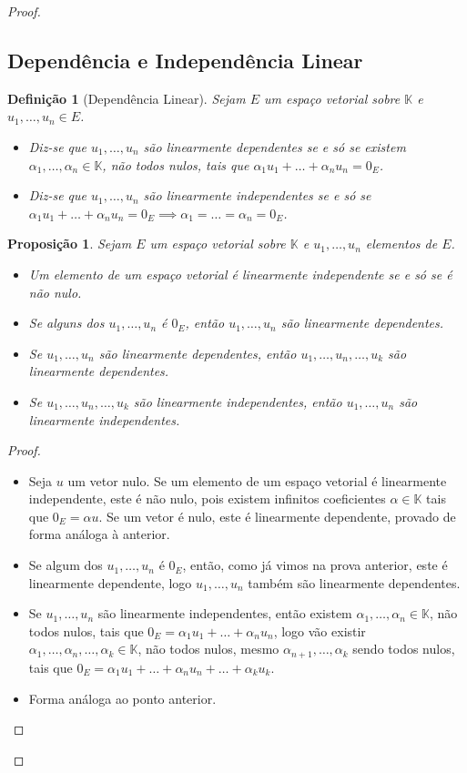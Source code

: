\documentclass{article}
\newtheorem{proposition}{Proposição}[section]
\newtheorem{definition}{Definição}[section]
\begin{document}
\begin{proof}
\subsection{Dependência e Independência Linear}

	\begin{definition}[Dependência Linear]
		Sejam $E$ um espaço vetorial sobre $\mathbb{K}$ e $u_1,\dots,u_n \in E$.
		\begin{itemize}
    			\item Diz-se que $u_1,\dots,u_n$ são linearmente dependentes se e só se existem $\alpha_1,\dots,\alpha_n \in \mathbb{K}$, não todos nulos, tais que $\alpha_1 u_1 + \dots +\alpha_n u_n = 0_E$.
			\item Diz-se que $u_1,\dots,u_n$ são linearmente independentes se e só se $\alpha_1 u_1 + \dots +\alpha_n u_n = 0_E \implies \alpha_1 = \dots =\alpha_n= 0_E$.
		\end{itemize}
	\end{definition}

	\begin{proposition}
		Sejam $E$ um espaço vetorial sobre $\mathbb{K}$ e $u_1,\dots,u_n$ elementos de $E$.
		\begin{itemize}
   		 \item Um elemento de um espaço vetorial é linearmente independente se e só se é não nulo.
    		\item Se alguns dos $u_1,\dots,u_n$ é $0_E$, então $u_1,\dots,u_n$ são linearmente dependentes.
    		\item Se $u_1,\dots,u_n$ são linearmente dependentes, então $u_1,\dots,u_n,\dots,u_k$ são linearmente dependentes.
    		\item Se $u_1,\dots,u_n,\dots,u_k$ são linearmente independentes, então $u_1,\dots,u_n$ são linearmente independentes.
		\end{itemize} 

	\end{proposition}

	\begin{proof}
	   \begin{itemize}
		\item Seja $u$ um vetor nulo. Se um elemento de um espaço vetorial é linearmente independente, este é não nulo, pois existem infinitos coeficientes $\alpha \in \mathbb{K}$ tais que $0_E=\alpha u$.
		Se um vetor é nulo, este é linearmente dependente, provado de forma análoga à anterior.
		\item Se algum dos $u_1,\dots,u_n$ é $0_E$, então, como já vimos na prova anterior, este é linearmente dependente, logo $u_1,\dots,u_n$ também são linearmente dependentes.
		\item Se $u_1,\dots,u_n$ são linearmente independentes, então existem $\alpha_1,\dots,\alpha_n \in \mathbb{K}$, não todos nulos, tais que $0_E=\alpha_1 u_1+\dots+\alpha_n u_n$, logo vão existir $\alpha_1,\dots,\alpha_n,\dots,\alpha_k \in \mathbb{K}$, não todos nulos, mesmo $\alpha_{n+1},\dots,\alpha_k$ sendo todos nulos, tais que $0_E=\alpha_1 u_1+\dots+\alpha_n u_n+\dots+\alpha_k u_k$.
		\item Forma análoga ao ponto anterior.


\end{itemize}
\end{proof}
\end{proof}
\end{document}
